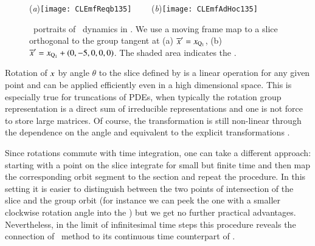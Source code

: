 %
\begin{figure}[ht]
\begin{center}
  (\textit{a})\texttt{[image: CLEmfReqb135]}
~~~~(\textit{b})\texttt{[image: CLEmfAdHoc135]}
\end{center}
\caption{
\Statesp\ portraits of \cLe\ dynamics in \reducedsp. We use a
moving frame map to a slice orthogonal to the group tangent
at  (a) ${\overline{x}'}  = x_{\mathrm{Q}_{1}}$, (b) ${\overline{x}'}  =
x_{\mathrm{Q}_{1}}+(0,-5,0,0,0)$. The shaded area indicates the \sset.
    }
\label{fig:CLEmfAdHoc}
\end{figure}



Rotation of $x$ by angle $\theta$
to the slice defined by  is a linear operation
for any given point and can be applied efficiently
even in a high dimensional space. This is especially true
for truncations of PDEs, when typically the rotation group
representation is a direct sum of irreducible
representations and one is not force to store large matrices.
Of course, the transformation is still non-linear
through the dependence on the angle and equivalent to the
explicit transformations .


Since rotations commute with time integration, one can take a
different approach: starting with a point on the slice
integrate for small but finite time and then map the
corresponding orbit segment to the section and repeat the
procedure. In this setting it is easier to distinguish
between the two points of intersection of the slice and the
group orbit (for instance we can peek the one with a smaller
clockwise rotation angle into the \slice) but we get no
further practical advantages. Nevertheless, in the limit of
infinitesimal time steps this procedure reveals the
connection of \mframes\ method to its continuous time
counterpart of .
